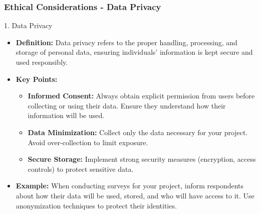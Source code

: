 \documentclass[aspectratio=169]{beamer}
\begin{document}
\begin{frame}[fragile]
    \frametitle{Ethical Considerations - Data Privacy}
    \begin{block}{1. Data Privacy}
        \begin{itemize}
            \item \textbf{Definition:} Data privacy refers to the proper handling, processing, and storage of personal data, ensuring individuals’ information is kept secure and used responsibly.
            \item \textbf{Key Points:}
            \begin{itemize}
                \item \textbf{Informed Consent:} Always obtain explicit permission from users before collecting or using their data. Ensure they understand how their information will be used.
                \item \textbf{Data Minimization:} Collect only the data necessary for your project. Avoid over-collection to limit exposure.
                \item \textbf{Secure Storage:} Implement strong security measures (encryption, access controls) to protect sensitive data.
            \end{itemize}
            \item \textbf{Example:} When conducting surveys for your project, inform respondents about how their data will be used, stored, and who will have access to it. Use anonymization techniques to protect their identities.
        \end{itemize}
    \end{block}
\end{frame}
\end{document}
